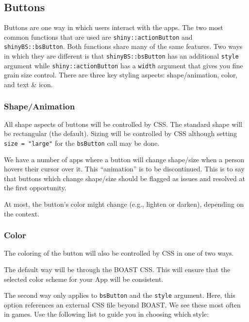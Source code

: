 \documentclass[]{book}
\begin{document}
\hypertarget{buttons}{%
\subsection{Buttons}\label{buttons}}

Buttons are one way in which users interact with the apps. The two most common functions that are used are \texttt{shiny::actionButton} and \texttt{shinyBS::bsButton}. Both functions share many of the same features. Two ways in which they are different is that \texttt{shinyBS::bsButton} has an additional \texttt{style} argument while \texttt{shiny::actionButton} has a \texttt{width} argument that gives you fine grain size control. There are three key styling aspects: shape/animation, color, and text \& icon.

\hypertarget{shapeanimation}{%
\subsubsection{Shape/Animation}\label{shapeanimation}}

All shape aspects of buttons will be controlled by CSS. The standard shape will be rectangular (the default). Sizing will be controlled by CSS although setting \texttt{size\ =\ "large"} for the \texttt{bsButton} call may be done.

We have a number of apps where a button will change shape/size when a person hovers their cursor over it. This ``animation'' is to be discontinued. This is to say that buttons which change shape/size should be flagged as issues and resolved at the first opportunity.

At most, the button's color might change (e.g., lighten or darken), depending on the context.

\hypertarget{color}{%
\subsubsection{Color}\label{color}}

The coloring of the button will also be controlled by CSS in one of two ways.

The default way will be through the BOAST CSS. This will ensure that the selected color scheme for your App will be consistent.

The second way only applies to \texttt{bsButton} and the \texttt{style} argument. Here, this option references an external CSS file beyond BOAST. We see these most often in games. Use the following list to guide you in choosing which style:
\end{document}

